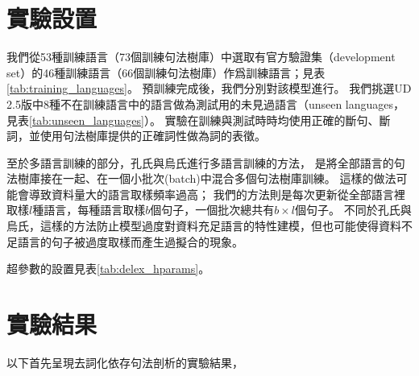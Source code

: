 \section{實驗設置}
\label{sec:delex_depparse_setting}



我們從53種訓練語言（73個訓練句法樹庫）中選取有官方驗證集（development set）的46種訓練語言（66個訓練句法樹庫）作爲訓練語言；見表\ref{tab:training_languages}。
預訓練完成後，我們分別對該模型進行。
我們挑選UD 2.5版中8種不在訓練語言中的語言做為測試用的未見過語言（unseen languages，見表\ref{tab:unseen_languages}）。
實驗在訓練與測試時時均使用正確的斷句、斷詞，並使用句法樹庫提供的正確詞性做為詞的表徵。

至於多語言訓練的部分，孔氏\cite{kondratyuk-straka-2019-75}與烏氏\cite{ustun2020udapter}進行多語言訓練的方法，
是將全部語言的句法樹庫接在一起、在一個小批次(batch)中混合多個句法樹庫訓練。
這樣的做法可能會導致資料量大的語言取樣頻率過高；
我們的方法則是每次更新從全部語言裡取樣$l$種語言，每種語言取樣$b$個句子，一個批次總共有$b \times l$個句子。
不同於孔氏與烏氏，這樣的方法防止模型過度對資料充足語言的特性建模，但也可能使得資料不足語言的句子被過度取樣而產生過擬合的現象。

超參數的設置見表\ref{tab:delex_hparams}。
\section{實驗結果}
以下首先呈現去詞化依存句法剖析的實驗結果，
